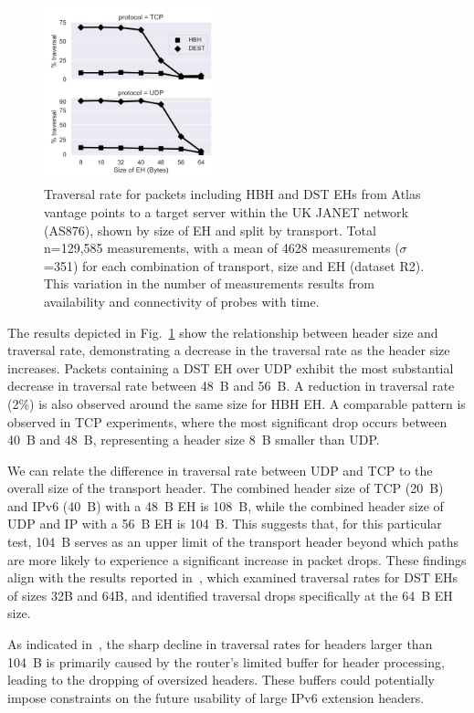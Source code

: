 \documentclass[conference]{IEEEtran}
\begin{document}
\begin{figure}[t]
\centering
  \includegraphics[width=0.45\textwidth]{sizes.png}
  \caption{Traversal rate for packets including HBH and DST EHs from Atlas
vantage points to a target server within the UK JANET network (AS876), shown by
size of EH and split by transport.  Total n=129,585 measurements, with a mean
of 4628 measurements ($\sigma$=351) for each combination of transport, size and
EH (dataset R2). This variation in the number of measurements results from
availability and connectivity of  probes with time.  }

  \label{fig:sizes}
\end{figure}
 

The results depicted in Fig.~\ref{fig:sizes} show the relationship between
header size and traversal rate, demonstrating a decrease in the traversal rate
as the header size increases.  Packets containing a DST EH over UDP exhibit the
most substantial decrease in traversal rate between 48~B and 56~B. A reduction
in traversal rate (2\%) is also observed around the same size for HBH EH. A
comparable pattern is observed in TCP experiments, where the most significant
drop occurs between 40~B and 48~B, representing a header size 8~B smaller than
UDP.

We can relate the difference in traversal rate between UDP and TCP to the overall
size of the transport header.  The combined header size of TCP (20~B) and IPv6
(40~B) with a 48~B EH is 108~B, while the combined header size of UDP and IP
with a 56~B EH is 104~B. This suggests that, for this particular test, 104~B
serves as an upper limit of the transport header beyond which paths are more
likely to experience a significant increase in packet drops. These findings
align with the results reported in~\cite{james-imc}, which examined traversal
rates for DST EHs of sizes 32B and 64B, and identified traversal drops
specifically at the 64~B EH size.

As indicated in~\cite{james-imce}, the sharp decline in traversal rates for
headers larger than 104~B is primarily caused by the router's limited buffer
for header processing, leading to the dropping of oversized headers.
These buffers could potentially impose constraints on the future usability of
large IPv6 extension headers.
\end{document}
